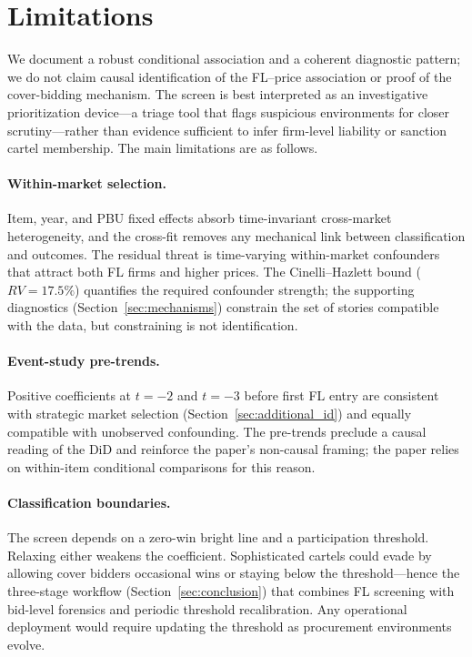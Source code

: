 \section{Limitations}
\label{sec:limitations}

We document a robust conditional association and a coherent
diagnostic pattern; we do not claim causal identification of the
FL--price association or proof of the cover-bidding mechanism.
The screen is best interpreted as an investigative prioritization
device---a triage tool that flags suspicious environments for closer
scrutiny---rather than evidence sufficient to infer firm-level
liability or sanction cartel membership. The main limitations are
as follows.

\paragraph{Within-market selection.}
Item, year, and PBU fixed effects absorb time-invariant cross-market
heterogeneity, and the cross-fit removes any mechanical link between
classification and outcomes. The residual threat is time-varying
within-market confounders that attract both FL firms and higher
prices. The Cinelli--Hazlett bound ($RV = 17.5\%$) quantifies the
required confounder strength; the supporting diagnostics
(Section~\ref{sec:mechanisms}) constrain the set of stories
compatible with the data, but constraining is not identification.

\paragraph{Event-study pre-trends.}
Positive coefficients at $t = -2$ and $t = -3$ before first FL
entry are consistent with strategic market selection
(Section~\ref{sec:additional_id}) and equally compatible with
unobserved confounding. The pre-trends preclude a causal reading
of the DiD and reinforce the paper's non-causal framing; the paper
relies on within-item conditional comparisons for this reason.

\paragraph{Classification boundaries.}
The screen depends on a zero-win bright line and a participation
threshold. Relaxing either weakens the coefficient. Sophisticated
cartels could evade by allowing cover bidders occasional wins or
staying below the threshold---hence the three-stage workflow
(Section~\ref{sec:conclusion}) that combines FL screening with
bid-level forensics and periodic threshold recalibration. Any
operational deployment would require updating the threshold as
procurement environments evolve.

